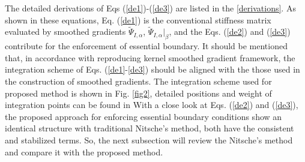 The detailed derivations of Eqs (\ref{de1})-(\ref{de3}) are listed in the \ref{derivations}. As shown in these equations, Eq. (\ref{de1}) is the conventional stiffness matrix evaluated by smoothed gradients $\tilde \Psi_{I,\alpha}$, $\tilde \Psi_{I,\alpha}\vert_\beta$, and the Eqs. (\ref{de2}) and (\ref{de3}) contribute for the enforcement of essential boundary. It should be mentioned that, in accordance with reproducing kernel smoothed gradient framework, the integration scheme of Eqs. (\ref{de1}-\ref{de3}) should be aligned with the those used in the construction of smoothed gradients. The integration scheme used for proposed method is shown in Fig. \ref{fig2}, \DIFdelbegin {}\DIFdelend \DIFaddbegin {}\DIFaddend detailed positions and weight of integration points \DIFaddbegin {}\DIFaddend can be found in \DIFdelbegin {}\DIFdelend \DIFaddbegin {}\DIFaddend With a close look at Eqs. (\ref{de2}) and (\ref{de3}), the proposed approach for enforcing essential boundary conditions show an identical structure with traditional Nitsche's method, both have the consistent and stabilized terms. So, the next subsection will review the Nitsche's method and compare it with the proposed method.

